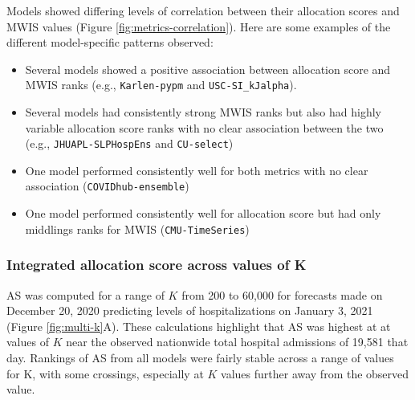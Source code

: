 \documentclass{article}\usepackage[]{graphicx}\usepackage[]{xcolor}
\begin{document}
Models showed differing levels of correlation between their allocation scores and MWIS values (Figure \ref{fig:metrics-correlation}).
Here are some examples of the different model-specific patterns observed:
\begin{itemize}
\item Several models showed a positive association between allocation score and MWIS ranks (e.g., \texttt{Karlen-pypm} and \texttt{USC-SI\_kJalpha}).
\item Several models had consistently strong MWIS ranks but also had highly variable allocation score ranks with no clear association between the two (e.g., \texttt{JHUAPL-SLPHospEns} and \texttt{CU-select})
\item One model performed consistently well for both metrics with no clear association (\texttt{COVIDhub-ensemble})
\item One model performed consistently well for allocation score but had only middlings ranks for MWIS (\texttt{CMU-TimeSeries})
\end{itemize}




\subsubsection{Integrated allocation score across values of K}





AS was computed for a range of $K$ from 200 to 60,000 for forecasts made on December 20, 2020 predicting levels of hospitalizations on January 3, 2021 (Figure \ref{fig:multi-k}A).
These calculations highlight that AS was highest at at values of $K$ near the observed nationwide total hospital admissions of 19,581 that day.
Rankings of AS from all models were fairly stable across a range of values for K, with some crossings, especially at $K$ values further away from the observed value.
\end{document}
